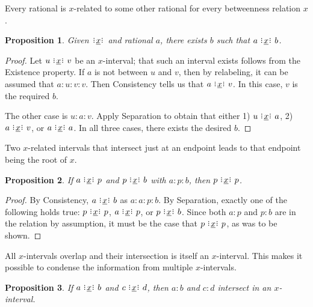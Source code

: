 \documentclass[12pt]{article}
\newtheorem{proposition}{Proposition}[section]
\begin{document}
Every rational is $x$-related to some other rational for every betweenness relation $x$. 

\begin{proposition}\label{br:existence}
    Given $\xrel$ and rational $a$, there exists $b$ such that $a \xrel b$. 
\end{proposition}

\begin{proof}
    Let $u \xrel v$ be an $x$-interval; that such an interval exists follows from the Existence property. If $a$ is not between $u$ and $v$, then by relabeling, it can be assumed that $a:u:v:v$. Then Consistency tells us that $a \xrel v$. In this case, $v$ is the required $b$. 

    The other case is $u:a:v$. Apply Separation to obtain that either 1) $u \xrel a$, 2) $a \xrel v$, or $a \xrel a$. In all three cases, there exists the desired $b$. 
\end{proof}

Two $x$-related intervals that intersect just at an endpoint leads to that endpoint being the root of $x$. 

\begin{proposition}\label{br:endpointed}
    If $a \xrel p$ and $p \xrel b$ with $a:p:b$, then $p \xrel p$.
\end{proposition}

\begin{proof}
    By Consistency, $a \xrel b$ as $a:a:p:b$.  By Separation, exactly one of the following holds true: $p \xrel p$,  \sout{$a \xrel p$}, or \sout{$p \xrel b$}. Since both $a:p$ and $p:b$ are in the relation by assumption, it must be the case that $p \xrel p$, as was to be shown. 
\end{proof}

All $x$-intervals overlap and their intersection is itself an $x$-interval. This makes it possible to condense the information from multiple $x$-intervals. 

\begin{proposition}\label{br:intersect}
    If $a \xrel b$ and $c \xrel d$, then $a:b$ and $c:d$ intersect in an $x$-interval. 
\end{proposition}
\end{document}
